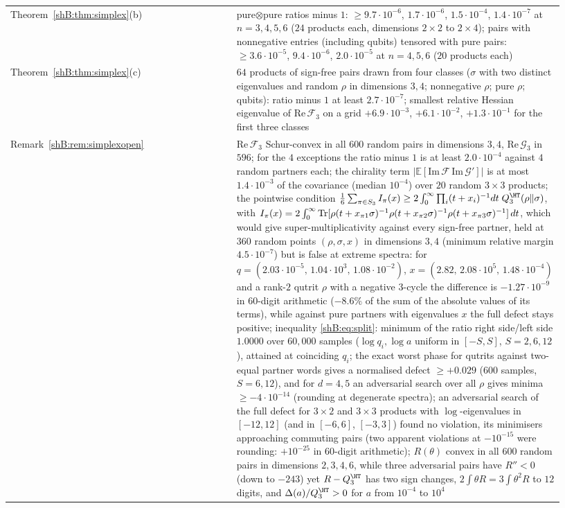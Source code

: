 {\begin{longtable}{>{\raggedright\arraybackslash}p{0.38\linewidth}>{\raggedright\arraybackslash}p{0.55\linewidth}}
Theorem~\ref{shB:thm:simplex}(b) & pure$\otimes$pure ratios minus $1$: $\ge9.7\cdot10^{-6}$, $1.7\cdot10^{-6}$, $1.5\cdot10^{-4}$, $1.4\cdot10^{-7}$ at $n=3,4,5,6$ ($24$ products each, dimensions $2\times2$ to $2\times4$); pairs with nonnegative entries (including qubits) tensored with pure pairs: $\ge3.6\cdot10^{-5}$, $9.4\cdot10^{-6}$, $2.0\cdot10^{-5}$ at $n=4,5,6$ ($20$ products each)\\
Theorem~\ref{shB:thm:simplex}(c) & $64$ products of sign-free pairs drawn from four classes ($\sigma$ with two distinct eigenvalues and random $\rho$ in dimensions $3,4$; nonnegative $\rho$; pure $\rho$; qubits): ratio minus $1$ at least $2.7\cdot10^{-7}$; smallest relative Hessian eigenvalue of $\mathrm{Re}\,\mathcal F_3$ on a grid $+6.9\cdot10^{-3}$, $+6.1\cdot10^{-2}$, $+1.3\cdot10^{-1}$ for the first three classes\\
Remark~\ref{shB:rem:simplexopen} & $\mathrm{Re}\,\mathcal F_3$ Schur-convex in all $600$ random pairs in dimensions $3,4$, $\mathrm{Re}\,\mathcal G_3$ in $596$; for the $4$ exceptions the ratio minus $1$ is at least $2.0\cdot10^{-4}$ against $4$ random partners each; the chirality term $|\mathbb E[\mathrm{Im}\,\mathcal F\,\mathrm{Im}\,\mathcal G']|$ is at most $1.4\cdot10^{-3}$ of the covariance (median $10^{-4}$) over $20$ random $3\times3$ products; the pointwise condition $\frac16\sum_{\pi\in S_3}I_\pi(x)\ge2\int_0^\infty\prod_i(t+x_i)^{-1}dt\;Q^\HT_3(\rho\|\sigma)$, with $I_\pi(x)=2\int_0^\infty\operatorname{Tr}[\rho(t+x_{\pi1}\sigma)^{-1}\rho(t+x_{\pi2}\sigma)^{-1}\rho(t+x_{\pi3}\sigma)^{-1}]\,dt$, which would give super-multiplicativity against every sign-free partner, held at $360$ random points $(\rho,\sigma,x)$ in dimensions $3,4$ (minimum relative margin $4.5\cdot10^{-7}$) but is false at extreme spectra: for $q=(2.03\cdot10^{-5},\,1.04\cdot10^{3},\,1.08\cdot10^{-2})$, $x=(2.82,\,2.08\cdot10^{5},\,1.48\cdot10^{-4})$ and a rank-$2$ qutrit $\rho$ with a negative $3$-cycle the difference is $-1.27\cdot10^{-9}$ in $60$-digit arithmetic ($-8.6\%$ of the sum of the absolute values of its terms), while against pure partners with eigenvalues $x$ the full defect stays positive; inequality \eqref{shB:eq:split}: minimum of the ratio right side/left side $1.0000$ over $60{,}000$ samples ($\log q_i,\log a$ uniform in $[-S,S]$, $S=2,6,12$), attained at coinciding $q_i$; the exact worst phase for qutrits against two-equal partner words gives a normalised defect $\ge+0.029$ ($600$ samples, $S=6,12$), and for $d=4,5$ an adversarial search over all $\rho$ gives minima $\ge-4\cdot10^{-14}$ (rounding at degenerate spectra); an adversarial search of the full defect for $3\times2$ and $3\times3$ products with $\log$-eigenvalues in $[-12,12]$ (and in $[-6,6]$, $[-3,3]$) found no violation, its minimisers approaching commuting pairs (two apparent violations at $-10^{-15}$ were rounding: $+10^{-25}$ in $60$-digit arithmetic); $R(\theta)$ convex in all $600$ random pairs in dimensions $2,3,4,6$, while three adversarial pairs have $R''<0$ (down to $-243$) yet $R-Q^\HT_3$ has two sign changes, $2\int\theta R=3\int\theta^2R$ to $12$ digits, and $\Delta(a)/Q^\HT_3>0$ for $a$ from $10^{-4}$ to $10^4$\\

\end{longtable}}
